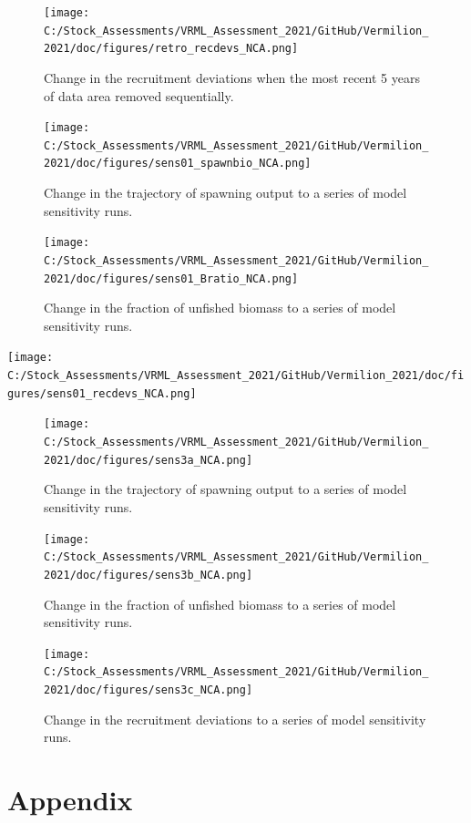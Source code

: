 \documentclass[
  english,
  a4paper,
]{article}
\begin{document}
\begin{figure}
\centering
\texttt{[image: C:/Stock\_Assessments/VRML\_Assessment\_2021/GitHub/Vermilion\_2021/doc/figures/retro\_recdevs\_NCA.png]}
\caption{Change in the recruitment deviations when the most recent 5 years of data area removed sequentially.\label{fig:retro-recdevs}}
\end{figure}

\begin{figure}
\centering
\texttt{[image: C:/Stock\_Assessments/VRML\_Assessment\_2021/GitHub/Vermilion\_2021/doc/figures/sens01\_spawnbio\_NCA.png]}
\caption{Change in the trajectory of spawning output to a series of model sensitivity runs.\label{fig:sens1-spawnb}}
\end{figure}

\begin{figure}
\centering
\texttt{[image: C:/Stock\_Assessments/VRML\_Assessment\_2021/GitHub/Vermilion\_2021/doc/figures/sens01\_Bratio\_NCA.png]}
\caption{Change in the fraction of unfished biomass to a series of model sensitivity runs.\label{fig:sens1-bratio}}
\end{figure}

\texttt{[image: C:/Stock\_Assessments/VRML\_Assessment\_2021/GitHub/Vermilion\_2021/doc/figures/sens01\_recdevs\_NCA.png]}

\begin{figure}
\centering
\texttt{[image: C:/Stock\_Assessments/VRML\_Assessment\_2021/GitHub/Vermilion\_2021/doc/figures/sens3a\_NCA.png]}
\caption{Change in the trajectory of spawning output to a series of model sensitivity runs.\label{fig:sens3a}}
\end{figure}

\begin{figure}
\centering
\texttt{[image: C:/Stock\_Assessments/VRML\_Assessment\_2021/GitHub/Vermilion\_2021/doc/figures/sens3b\_NCA.png]}
\caption{Change in the fraction of unfished biomass to a series of model sensitivity runs.\label{fig:sens3b}}
\end{figure}

\begin{figure}
\centering
\texttt{[image: C:/Stock\_Assessments/VRML\_Assessment\_2021/GitHub/Vermilion\_2021/doc/figures/sens3c\_NCA.png]}
\caption{Change in the recruitment deviations to a series of model sensitivity runs.\label{fig:sens3c}}
\end{figure}

\clearpage

\hypertarget{appendix}{%
\section{Appendix}\label{appendix}}
\end{document}
